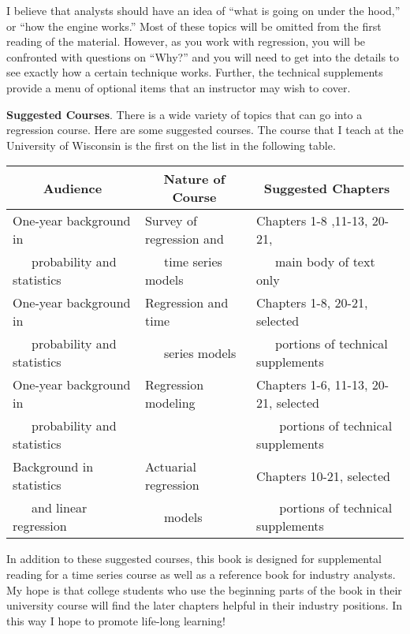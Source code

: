 I believe that analysts should have an idea of ``what is going on
under the hood,'' or ``how the engine works.'' Most of these topics
will be omitted from the first reading of the material. However, as
you work with regression, you will be confronted with questions on
``Why?'' and you will need to get into the details to see exactly
how a certain technique works. Further, the technical supplements
provide a menu of optional items that an instructor may wish to
cover.


\textbf{Suggested Courses}. There is a wide variety of topics that
can go into a regression course. Here are some suggested courses.
The course that I teach at the University of Wisconsin is the first
on the list in the following table.

\begin{table}[h]

\begin{tabular}{lll}
\hline
\multicolumn{1}{c}{Audience} & \multicolumn{1}{c}{Nature of Course}& \multicolumn{1}{c}{Suggested Chapters} \\
\hline One-year background in & Survey of regression and  &
 Chapters
1-8 ,11-13, 20-21,\\
~~~probability and statistics & ~~~time series models &
~~~main body of text only \\
One-year background in & Regression and time  &
 Chapters
1-8, 20-21, selected \\
~~~probability and statistics & ~~~series models &
~~~portions of technical supplements \\
One-year background in & Regression modeling  &
 Chapters
1-6, 11-13, 20-21, selected \\
~~~probability and statistics & &
~~~ portions of technical supplements \\
Background in statistics& Actuarial regression&
 Chapters
10-21, selected \\
~~~and linear regression&  ~~~models  &
~~~ portions of technical supplements \\
 \hline
\end{tabular}
\end{table}

In addition to these suggested courses, this book is designed for
supplemental reading for a time series course as well as a reference
book for industry analysts. My hope is that college students who use
the beginning parts of the book in their university course will find
the later chapters helpful in their industry positions. In this way
I hope to promote life-long learning!



